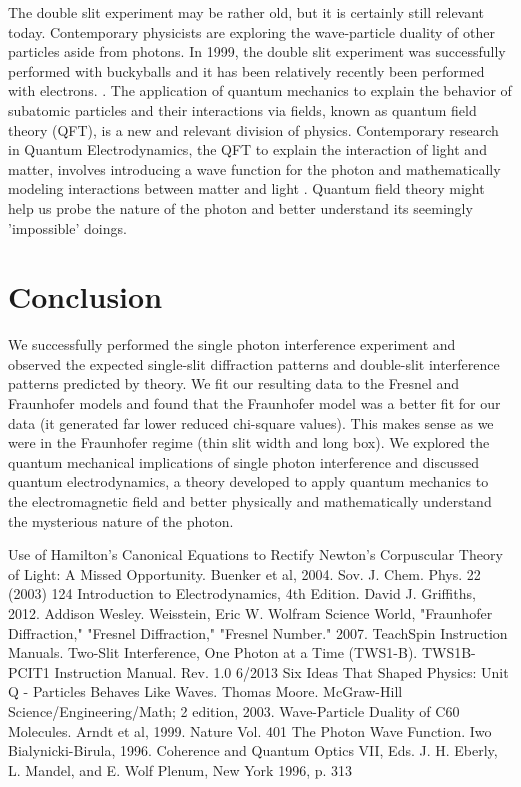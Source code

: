 \documentclass[prb,preprint]{revtex4-1}
\begin{document}
The double slit experiment may be rather old, but it is certainly still relevant today.  Contemporary physicists are exploring the wave-particle duality of other particles aside from photons.  In 1999, the double slit experiment was successfully performed with buckyballs and it has been relatively recently been performed with electrons.   \cite{bucky}.  The application of quantum mechanics to explain the behavior of subatomic particles and their interactions via fields, known as quantum field theory (QFT), is a new and relevant division of physics.  Contemporary research in Quantum Electrodynamics, the QFT to explain the interaction of light and matter, involves introducing a wave function for the photon and mathematically modeling interactions between matter and light \cite{iwo}.  Quantum field theory might help us probe the nature of the photon and better understand its seemingly 'impossible' doings.

\section{Conclusion}

We successfully performed the single photon interference experiment and observed the expected single-slit diffraction patterns and double-slit interference patterns predicted by theory.  We fit our resulting data to the Fresnel and Fraunhofer models and found that the Fraunhofer model was a better fit for our data (it generated far lower reduced chi-square values).  This makes sense as we were in the Fraunhofer regime (thin slit width and long box).  We explored the quantum mechanical implications of single photon interference and discussed quantum electrodynamics, a theory developed to apply quantum mechanics to the electromagnetic field and better physically and mathematically understand the mysterious nature of the photon.


\begin{thebibliography}{3}
 Use of Hamilton's Canonical Equations to Rectify Newton's Corpuscular Theory of Light:  A Missed Opportunity.  Buenker et al, 2004.  Sov. J. Chem. Phys. 22 (2003) 124
 Introduction to Electrodynamics, 4th Edition.  David J. Griffiths, 2012.  Addison Wesley.
Weisstein, Eric W. Wolfram Science World, "Fraunhofer Diffraction," "Fresnel Diffraction," "Fresnel Number." 2007. 
 TeachSpin Instruction Manuals.  Two-Slit Interference, One Photon at a Time (TWS1-B).  TWS1B-PCIT1 Instruction Manual. Rev. 1.0 6/2013
 Six Ideas That Shaped Physics: Unit Q - Particles Behaves Like Waves.  Thomas Moore.  McGraw-Hill Science/Engineering/Math; 2 edition, 2003.
 Wave-Particle Duality of C60 Molecules.  Arndt et al, 1999.  Nature Vol. 401
The Photon Wave Function.  Iwo Bialynicki-Birula, 1996.  Coherence and Quantum Optics VII, Eds. J. H. Eberly, L. Mandel, and E. Wolf
Plenum, New York 1996, p. 313
\end{thebibliography}
\end{document}
